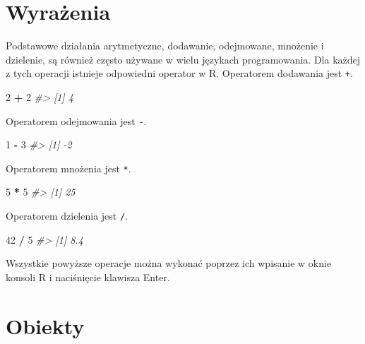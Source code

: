 \documentclass[paper=6in:9in,pagesize=pdftex,headinclude=on,footinclude=on,10pt]{scrbook}
\newenvironment{Shaded}{\begin{snugshade}}{\end{snugshade}}
\newcommand{\CommentTok}[1]{\textcolor[rgb]{0.56,0.35,0.01}{\textit{#1}}}
\newcommand{\DecValTok}[1]{\textcolor[rgb]{0.00,0.00,0.81}{#1}}
\newcommand{\OperatorTok}[1]{\textcolor[rgb]{0.81,0.36,0.00}{\textbf{#1}}}
\newcommand{\StringTok}[1]{\textcolor[rgb]{0.31,0.60,0.02}{#1}}
\begin{document}
\hypertarget{wyraux17cenia}{%
\section{Wyrażenia}\label{wyraux17cenia}}

Podstawowe działania arytmetyczne, dodawanie, odejmowane, mnożenie i dzielenie, są również często używane w wielu językach programowania.
Dla każdej z tych operacji istnieje odpowiedni operator w R.
Operatorem dodawania jest \texttt{+}.

\begin{Shaded}
\begin{Highlighting}[]
\DecValTok{2} \OperatorTok{+}\StringTok{ }\DecValTok{2}
\CommentTok{#> [1] 4}
\end{Highlighting}
\end{Shaded}

Operatorem odejmowania jest \texttt{-}.

\begin{Shaded}
\begin{Highlighting}[]
\DecValTok{1} \OperatorTok{-}\StringTok{ }\DecValTok{3}
\CommentTok{#> [1] -2}
\end{Highlighting}
\end{Shaded}

Operatorem mnożenia jest \texttt{*}.

\begin{Shaded}
\begin{Highlighting}[]
\DecValTok{5} \OperatorTok{*}\StringTok{ }\DecValTok{5}
\CommentTok{#> [1] 25}
\end{Highlighting}
\end{Shaded}

Operatorem dzielenia jest \texttt{/}.

\begin{Shaded}
\begin{Highlighting}[]
\DecValTok{42} \OperatorTok{/}\StringTok{ }\DecValTok{5}
\CommentTok{#> [1] 8.4}
\end{Highlighting}
\end{Shaded}

Wszystkie powyższe operacje można wykonać poprzez ich wpisanie w oknie konsoli R i naciśnięcie klawisza Enter.

\hypertarget{obiekty}{%
\section{Obiekty}\label{obiekty}}
\end{document}
